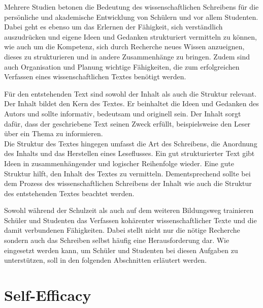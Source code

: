 \documentclass[../main.tex]{subfiles}
\begin{document}
Mehrere Studien betonen die Bedeutung des wissenschaftlichen Schreibens für die persönliche und akademische Entwicklung 
von Schülern und vor allem Studenten\cite{influencingUsingAi,ZukunftWissenschaftlichesPublizieren}. Dabei geht es ebenso um das Erlernen der Fähigkeit, sich verständlich auszudrücken und 
eigene Ideen und Gedanken strukturiert vermitteln zu können, wie auch um die Kompetenz, sich durch Recherche neues Wissen 
anzueignen, dieses zu strukturieren und in andere Zusammenhänge zu bringen. Zudem sind auch Organisation und Planung 
wichtige Fähigkeiten, die zum erfolgreichen Verfassen eines wissenschaftlichen Textes benötigt werden.\cite{SelfEfficacyBeliefs} 

Für den entstehenden Text sind sowohl der Inhalt als auch die Struktur relevant. Der Inhalt bildet den Kern des Textes. Er beinhaltet die Ideen und Gedanken des Autors und sollte 
informativ, bedeutsam und originell sein. Der Inhalt sorgt dafür, dass der geschriebene Text seinen Zweck erfüllt, beispielsweise 
den Leser über ein Thema zu informieren. \\
Die Struktur des Textes hingegen umfasst die Art des Schreibens, die Anordnung des Inhalts und das Herstellen eines Leseflusses. 
Ein gut strukturierter Text gibt Ideen in zusammenhängender und logischer Reihenfolge wieder. Eine gute Struktur hilft, den Inhalt des
Textes zu vermitteln. Dementsprechend sollte bei dem Prozess des wissenschaftlichen Schreibens der Inhalt wie auch die Struktur des entstehenden 
Textes beachtet werden.\cite{teachers}

Sowohl während der Schulzeit als auch auf dem weiteren Bildungsweg trainieren Schüler und Studenten das Verfassen kohärenter 
wissenschaftlicher Texte und die damit verbundenen Fähigkeiten. Dabei stellt nicht nur die nötige Recherche sondern auch das Schreiben selbst
häufig eine Herausforderung dar. Wie  eingesetzt werden kann, um Schüler und Studenten bei diesen Aufgaben zu 
unterstützen, soll in den folgenden Abschnitten erläutert werden. 

\section{Self-Efficacy}
\label{sec:efficacy}
\end{document}

